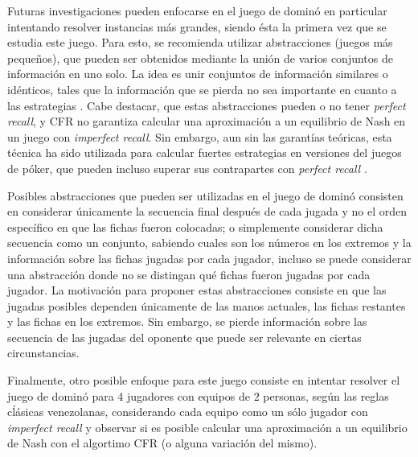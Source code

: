 Futuras investigaciones pueden enfocarse en el juego de dominó en particular intentando resolver instancias más grandes, siendo ésta la primera vez que se estudia este juego. Para esto, se recomienda utilizar abstracciones (juegos más pequeños), que pueden ser obtenidos mediante la unión de varios conjuntos de información en uno solo. La idea es unir conjuntos de información similares o idénticos, tales que la información que se pierda no sea importante en cuanto a las estrategias \cite[pp.~71-72]{bib:thesis-marc-lanctot}. Cabe destacar, que estas abstracciones pueden o no tener \textit{perfect recall}, y CFR no garantiza calcular una aproximación a un equilibrio de Nash en un juego con \textit{imperfect recall}. Sin embargo, aun sin las garantías teóricas, esta técnica ha sido utilizada para calcular fuertes estrategias en versiones del juegos de póker, que pueden incluso superar sus contrapartes con \textit{perfect recall} \cite{bib:imperfect-recall}.

Posibles abstracciones que pueden ser utilizadas en el juego de dominó consisten en considerar únicamente la secuencia final después de cada jugada y no el orden específico en que las fichas fueron colocadas; o simplemente considerar dicha secuencia como un conjunto, sabiendo cuales son los números en los extremos y la información sobre las fichas jugadas por cada jugador, incluso se puede considerar una abstracción donde no se distingan qué fichas fueron jugadas por cada jugador. La motivación para proponer estas abstracciones consiste en que las jugadas posibles dependen únicamente de las manos actuales, las fichas restantes y las fichas en los extremos. Sin embargo, se pierde información sobre las secuencia de las jugadas del oponente que puede ser relevante en ciertas circunstancias.

Finalmente, otro posible enfoque para este juego consiste en intentar resolver el juego de dominó para $4$ jugadores con equipos de $2$ personas, según las reglas cĺásicas venezolanas, considerando cada equipo como un sólo jugador con \textit{imperfect recall} y observar si es posible calcular una aproximación a un equilibrio de Nash con el algortimo CFR (o alguna variación del mismo).